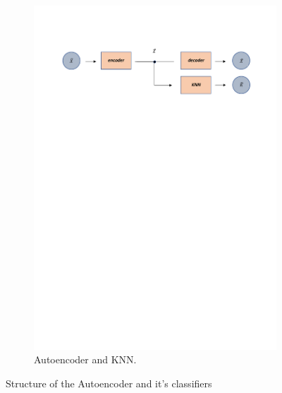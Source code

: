 \begin{figure}[H]
\begin{subfigure}{0.98\linewidth} 
  \centering
  \includegraphics[width=\linewidth]{Figuras_tfg/Diagram_auto_KNN}
  \caption{Autoencoder and KNN.}
  \label{fig:FigB_Autoencoder_KNN} 
\end{subfigure}
  \caption{Structure of the Autoencoder and it's classifiers}
 \label{fig:Autoencoder_architecture}
\end{figure}

